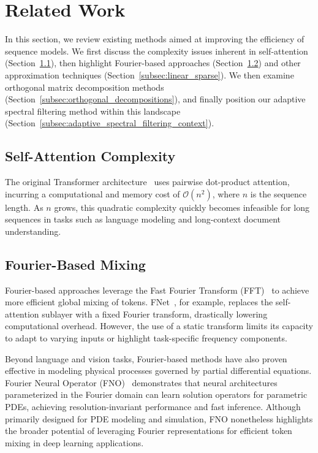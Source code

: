 \section{Related Work}
\label{sec:related_work}

In this section, we review existing methods aimed at improving the efficiency of sequence models. We first discuss the complexity issues inherent in self-attention (Section~\ref{subsec:self_attention_complexity}), then highlight Fourier-based approaches (Section~\ref{subsec:fourier_based_mixing}) and other approximation techniques (Section~\ref{subsec:linear_sparse}). We then examine orthogonal matrix decomposition methods (Section~\ref{subsec:orthogonal_decompositions}), and finally position our adaptive spectral filtering method within this landscape (Section~\ref{subsec:adaptive_spectral_filtering_context}).

\subsection{Self-Attention Complexity}
\label{subsec:self_attention_complexity}
The original Transformer architecture~\cite{vaswani2017attention} uses pairwise dot-product attention, incurring a computational and memory cost of \(\mathcal{O}(n^2)\), where \(n\) is the sequence length. As \(n\) grows, this quadratic complexity quickly becomes infeasible for long sequences in tasks such as language modeling and long-context document understanding.

\subsection{Fourier-Based Mixing}
\label{subsec:fourier_based_mixing}
Fourier-based approaches leverage the Fast Fourier Transform (FFT)~\cite{cooley1965algorithm} to achieve more efficient global mixing of tokens. FNet~\cite{leethorp2022fnetmixingtokensfourier}, for example, replaces the self-attention sublayer with a fixed Fourier transform, drastically lowering computational overhead. However, the use of a static transform limits its capacity to adapt to varying inputs or highlight task-specific frequency components.

Beyond language and vision tasks, Fourier-based methods have also proven effective in modeling physical processes governed by partial differential equations. Fourier Neural Operator (FNO)~\cite{li2021fourierneuraloperatorparametric} demonstrates that neural architectures parameterized in the Fourier domain can learn solution operators for parametric PDEs, achieving resolution-invariant performance and fast inference. Although primarily designed for PDE modeling and simulation, FNO nonetheless highlights the broader potential of leveraging Fourier representations for efficient token mixing in deep learning applications.

